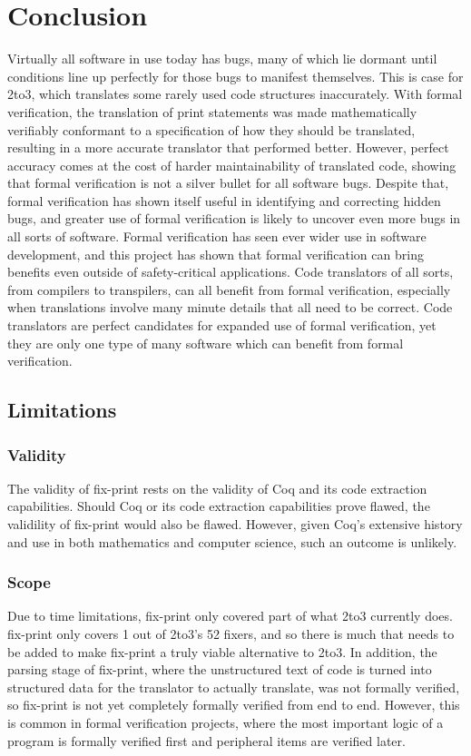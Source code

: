 \section{Conclusion}
Virtually all software in use today has bugs, many of which lie dormant until conditions line up perfectly for those bugs to manifest themselves. This is case for 2to3, which translates some rarely used code structures inaccurately. With formal verification, the translation of print statements was made mathematically verifiably conformant to a specification of how they should be translated, resulting in a more accurate translator that performed better. However, perfect accuracy comes at the cost of harder maintainability of translated code, showing that formal verification is not a silver bullet for all software bugs. Despite that, formal verification has shown itself useful in identifying and correcting hidden bugs, and greater use of formal verification is likely to uncover even more bugs in all sorts of software. Formal verification has seen ever wider use in software development, and this project has shown that formal verification can bring benefits even outside of safety-critical applications. Code translators of all sorts, from compilers to transpilers, can all benefit from formal verification, especially when translations involve many minute details that all need to be correct. Code translators are perfect candidates for expanded use of formal verification, yet they are only one type of many software which can benefit from formal verification.

\subsection{Limitations}

\subsubsection{Validity}
The validity of fix-print rests on the validity of Coq and its code extraction capabilities. Should Coq or its code extraction capabilities prove flawed, the validility of fix-print would also be flawed. However, given Coq's extensive history and use in both mathematics and computer science, such an outcome is unlikely.

\subsubsection{Scope}
Due to time limitations, fix-print only covered part of what 2to3 currently does. fix-print only covers 1 out of 2to3's 52 fixers, and so there is much that needs to be added to make fix-print a truly viable alternative to 2to3. In addition, the parsing stage of fix-print, where the unstructured text of code is turned into structured data for the translator to actually translate, was not formally verified, so fix-print is not yet completely formally verified from end to end. However, this is common in formal verification projects, where the most important logic of a program is formally verified first and peripheral items are verified later.

